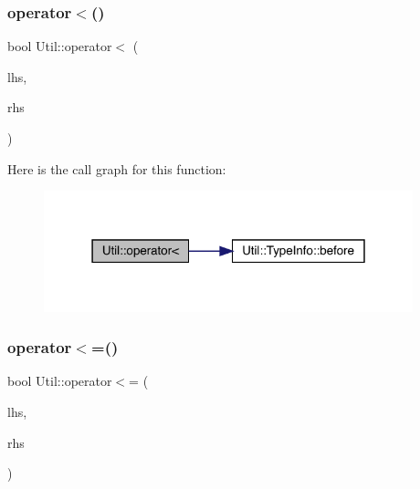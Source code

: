 \mbox{\label{namespaceUtil_a25f804a3db6eff35e4a4aa1f805be414}} 
\subsubsection{\texorpdfstring{operator$<$()}{operator<()}}
{\footnotesize\ttfamily bool Util\+::operator$<$ (\begin{DoxyParamCaption}\item[{const \mbox{\hyperlink{classUtil_1_1TypeInfo}{Type\+Info}} \&}]{lhs,  }\item[{const \mbox{\hyperlink{classUtil_1_1TypeInfo}{Type\+Info}} \&}]{rhs }\end{DoxyParamCaption})\hspace{0.3cm}{\ttfamily [inline]}}

Here is the call graph for this function\+:\nopagebreak
\begin{figure}[H]
\begin{center}
\leavevmode
\includegraphics[width=303pt]{d2/daf/namespaceUtil_a25f804a3db6eff35e4a4aa1f805be414_cgraph}
\end{center}
\end{figure}
\mbox{\label{namespaceUtil_a42a6d3e64e27ce826387a74b547a486a}} 
\subsubsection{\texorpdfstring{operator$<$=()}{operator<=()}}
{\footnotesize\ttfamily bool Util\+::operator$<$= (\begin{DoxyParamCaption}\item[{const \mbox{\hyperlink{classUtil_1_1TypeInfo}{Type\+Info}} \&}]{lhs,  }\item[{const \mbox{\hyperlink{classUtil_1_1TypeInfo}{Type\+Info}} \&}]{rhs }\end{DoxyParamCaption})\hspace{0.3cm}{\ttfamily [inline]}}

